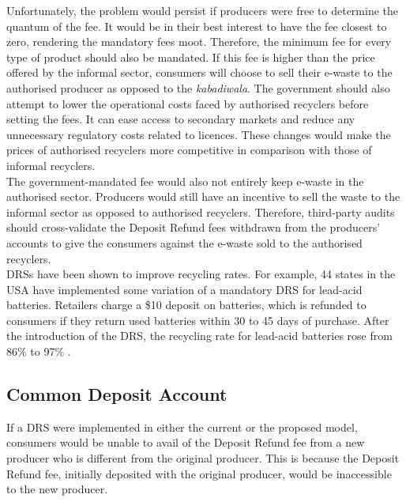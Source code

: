 \documentclass[a4paper, 12pt]{article}
\begin{document}
                      Unfortunately, the problem would persist if producers were free to determine the quantum of the fee. It would be in their best interest to have the fee closest to zero, rendering the mandatory fees moot. Therefore, the minimum fee for every type of product should also be mandated. If this fee is higher than the price offered by the informal sector, consumers will choose to sell their e-waste to the authorised producer as opposed to the \textit{kabadiwala}. The government should also attempt to lower the operational costs faced by authorised recyclers before setting the fees. It can ease access to secondary markets and reduce any unnecessary regulatory costs related to licences. These changes would make the prices of authorised recyclers more competitive in comparison with those of informal recyclers.\\
                    
                    The government-mandated fee would also not entirely keep e-waste in the authorised sector. Producers would still have an incentive to sell the waste to the informal sector as opposed to authorised recyclers. Therefore, third-party audits should cross-validate the Deposit Refund fees withdrawn from the producers’ accounts to give the consumers against the e-waste sold to the authorised recyclers.\\ 
                    
                    DRSs have been shown to improve recycling rates. For example, 44 states in the USA have implemented some variation of a mandatory DRS for lead-acid batteries. Retailers charge a \$10 deposit on batteries, which is refunded to consumers if they return used batteries within 30 to 45 days of purchase. After the introduction of the DRS, the recycling rate for lead-acid batteries rose from 86\% to 97\% \parencite{wallspaper}.
                    
\subsection{Common Deposit Account}
                    
                    If a DRS were implemented in either the current or the proposed model, consumers would be unable to avail of the Deposit Refund fee from a new producer who is different from the original producer. This is because the Deposit Refund fee, initially deposited with the original producer, would be inaccessible to the new producer.\\
                    
\end{document}
